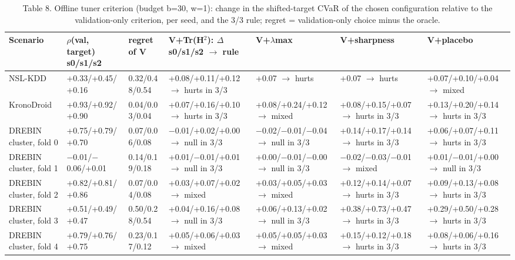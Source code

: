 \begin{table}[t]
\centering\small
\caption{Table 8. Offline tuner criterion (budget b=30, w=1): change in the shifted-target CVaR of the chosen configuration relative to the validation-only criterion, per seed, and the 3/3 rule; regret = validation-only choice minus the oracle.}
\label{tab:e1_offline}
\begin{tabular}{lllllll}
\toprule
Scenario & $\rho$(val, target) s0/s1/s2 & regret of V & V+Tr(H$^2$): $\Delta$ s0/s1/s2 $\rightarrow$ rule & V+$\lambda$max & V+sharpness & V+placebo \\
\midrule
NSL-KDD & +0.33/+0.45/+0.16 & 0.32/0.48/0.54 & +0.08/+0.11/+0.12 $\rightarrow$ hurts in 3/3 & +0.07 $\rightarrow$ hurts & +0.07 $\rightarrow$ hurts & +0.07/+0.10/+0.04 $\rightarrow$ mixed \\
KronoDroid & +0.93/+0.92/+0.90 & 0.04/0.03/0.04 & +0.07/+0.16/+0.10 $\rightarrow$ hurts in 3/3 & +0.08/+0.24/+0.12 $\rightarrow$ mixed & +0.08/+0.15/+0.07 $\rightarrow$ hurts in 3/3 & +0.13/+0.20/+0.14 $\rightarrow$ hurts in 3/3 \\
DREBIN cluster, fold 0 & +0.75/+0.79/+0.70 & 0.07/0.06/0.08 & $-$0.01/+0.02/+0.00 $\rightarrow$ null in 3/3 & $-$0.02/$-$0.01/$-$0.04 $\rightarrow$ null in 3/3 & +0.14/+0.17/+0.14 $\rightarrow$ hurts in 3/3 & +0.06/+0.07/+0.11 $\rightarrow$ hurts in 3/3 \\
DREBIN cluster, fold 1 & $-$0.01/$-$0.06/+0.01 & 0.14/0.19/0.18 & +0.01/$-$0.01/+0.01 $\rightarrow$ null in 3/3 & +0.00/$-$0.01/$-$0.00 $\rightarrow$ null in 3/3 & $-$0.02/$-$0.03/$-$0.01 $\rightarrow$ mixed & +0.01/$-$0.01/+0.00 $\rightarrow$ null in 3/3 \\
DREBIN cluster, fold 2 & +0.82/+0.81/+0.86 & 0.07/0.04/0.08 & +0.03/+0.07/+0.02 $\rightarrow$ mixed & +0.03/+0.05/+0.03 $\rightarrow$ mixed & +0.12/+0.14/+0.07 $\rightarrow$ hurts in 3/3 & +0.09/+0.13/+0.08 $\rightarrow$ hurts in 3/3 \\
DREBIN cluster, fold 3 & +0.51/+0.49/+0.47 & 0.50/0.28/0.54 & +0.04/+0.16/+0.08 $\rightarrow$ null in 3/3 & +0.06/+0.13/+0.02 $\rightarrow$ null in 3/3 & +0.38/+0.73/+0.47 $\rightarrow$ hurts in 3/3 & +0.29/+0.50/+0.28 $\rightarrow$ hurts in 3/3 \\
DREBIN cluster, fold 4 & +0.79/+0.76/+0.75 & 0.23/0.17/0.12 & +0.05/+0.06/+0.03 $\rightarrow$ mixed & +0.05/+0.05/+0.03 $\rightarrow$ mixed & +0.15/+0.12/+0.18 $\rightarrow$ hurts in 3/3 & +0.08/+0.06/+0.16 $\rightarrow$ hurts in 3/3 \\
\bottomrule
\end{tabular}
\end{table}
